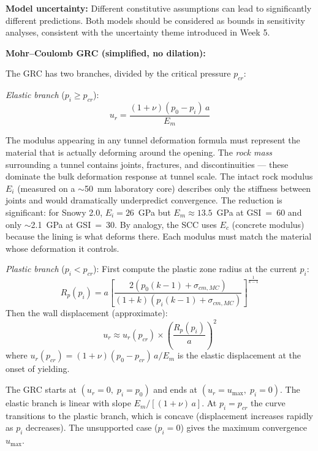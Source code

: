 \documentclass[a4paper,12pt]{article}
\begin{document}
\textbf{Model uncertainty:} Different constitutive assumptions can lead to significantly different predictions. Both models should be considered as bounds in sensitivity analyses, consistent with the uncertainty theme introduced in Week 5.

\textbf{Mohr--Coulomb GRC (simplified, no dilation):}

The GRC has two branches, divided by the critical pressure $p_{cr}$:

\textit{Elastic branch} ($p_i \geq p_{cr}$):
\[
u_r = \frac{(1+\nu)(p_0 - p_i)\,a}{E_m}
\]

\begin{notebox}
The modulus appearing in any tunnel deformation formula must represent the material that is actually deforming around the opening. The \textit{rock mass} surrounding a tunnel contains joints, fractures, and discontinuities --- these dominate the bulk deformation response at tunnel scale. The intact rock modulus $E_i$ (measured on a $\sim$50~mm laboratory core) describes only the stiffness between joints and would dramatically underpredict convergence. The reduction is significant: for Snowy 2.0, $E_i = 26$~GPa but $E_m \approx 13.5$~GPa at GSI~=~60 and only $\sim$2.1~GPa at GSI~=~30. By analogy, the SCC uses $E_c$ (concrete modulus) because the lining is what deforms there. Each modulus must match the material whose deformation it controls.
\end{notebox}

\textit{Plastic branch} ($p_i < p_{cr}$): First compute the plastic zone radius at the current $p_i$:
\[
R_p(p_i) = a \left[ \frac{2\left(p_0(k-1)+\sigma_{cm,MC}\right)}{(1+k)\left(p_i(k-1)+\sigma_{cm,MC}\right)} \right]^{\frac{1}{k-1}}
\]
Then the wall displacement (approximate):
\[
u_r \approx u_r(p_{cr}) \times \left(\frac{R_p(p_i)}{a}\right)^2
\]
where $u_r(p_{cr}) = (1+\nu)(p_0-p_{cr})\,a/E_m$ is the elastic displacement at the onset of yielding.

\begin{notebox}
The GRC starts at $(u_r=0,\; p_i=p_0)$ and ends at $(u_r=u_{\max},\; p_i=0)$. The elastic branch is linear with slope $E_m/[(1+\nu)\,a]$. At $p_i = p_{cr}$ the curve transitions to the plastic branch, which is concave (displacement increases rapidly as $p_i$ decreases). The unsupported case ($p_i = 0$) gives the maximum convergence $u_{\max}$.
\end{notebox}
\end{document}
